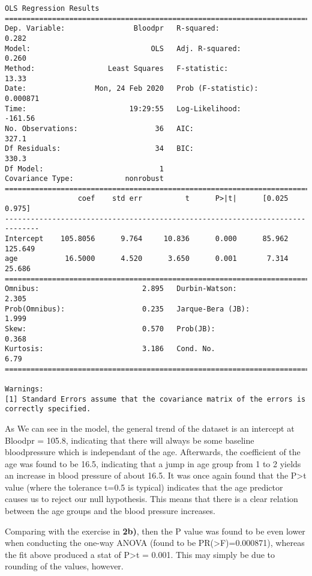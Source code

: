 \documentclass[6pt]{article}
\begin{document}
    \begin{Verbatim}[commandchars=\\\{\}]
                            OLS Regression Results                            
==============================================================================
Dep. Variable:                Bloodpr   R-squared:                       0.282
Model:                            OLS   Adj. R-squared:                  0.260
Method:                 Least Squares   F-statistic:                     13.33
Date:                Mon, 24 Feb 2020   Prob (F-statistic):           0.000871
Time:                        19:29:55   Log-Likelihood:                -161.56
No. Observations:                  36   AIC:                             327.1
Df Residuals:                      34   BIC:                             330.3
Df Model:                           1                                         
Covariance Type:            nonrobust                                         
==============================================================================
                 coef    std err          t      P>|t|      [0.025      0.975]
------------------------------------------------------------------------------
Intercept    105.8056      9.764     10.836      0.000      85.962     125.649
age           16.5000      4.520      3.650      0.001       7.314      25.686
==============================================================================
Omnibus:                        2.895   Durbin-Watson:                   2.305
Prob(Omnibus):                  0.235   Jarque-Bera (JB):                1.999
Skew:                           0.570   Prob(JB):                        0.368
Kurtosis:                       3.186   Cond. No.                         6.79
==============================================================================

Warnings:
[1] Standard Errors assume that the covariance matrix of the errors is correctly specified.

    \end{Verbatim}

    As We can see in the model, the general trend of the dataset is an
intercept at Bloodpr = 105.8, indicating that there will always be some
baseline bloodpressure which is independant of the age. Afterwards, the
coefficient of the age was found to be 16.5, indicating that a jump in
age group from 1 to 2 yields an increase in blood pressure of about
16.5. It was once again found that the
P\textgreater{}\textbar{}t\textbar{} value (where the tolerance t=0.5 is
typical) indicates that the age predictor causes us to reject our null
hypothesis. This means that there is a clear relation between the age
groups and the blood pressure increases.

Comparing with the exercise in \textbf{2b)}, then the P value was found
to be even lower when conducting the one-way ANOVA (found to be
PR(\textgreater{}F)=0.000871), whereas the fit above produced a stat of
P\textgreater{}\textbar{}t\textbar{} = 0.001. This may simply be due to
rounding of the values, however.


    
    
    
    
\end{document}
